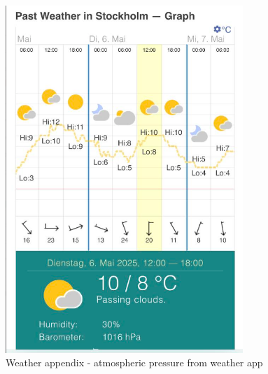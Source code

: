 \documentclass[12pt,a4paper]{article}
\begin{document}
\begin{figure}[H]
\centering
\includegraphics[width=0.8\textwidth]{weather appendix.png}
\caption{Weather appendix - atmospheric pressure from weather app}
\label{fig:weather_appendix}
\end{figure}
\end{document}
